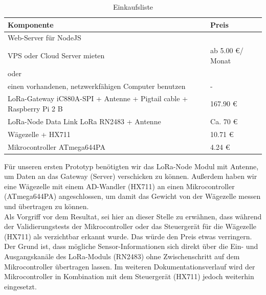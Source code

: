\begin{table}[h]
    \caption{Einkaufsliste}
    \centering

    \begin{tabular}{ | l |  l | }
    \hline
    Komponente & Preis \\ \hline
    Web-Server für NodeJS  & \\
    VPS oder Cloud Server mieten & ab 5.00 \euro / Monat \\
    oder & \\
    einen vorhandenen, netzwerkfähigen Computer benutzen & - \\ \hline
    LoRa-Gateway iC880A-SPI + Antenne + Pigtail cable + Raspberry Pi 2 B & 167.90 \euro \\ \hline
    LoRa-Node Data Link LoRa RN2483 + Antenne & Ca. 70 \euro \\ \hline
    Wägezelle + HX711 & 10.71 \euro \\ \hline
    Mikrocontroller ATmega644PA & 4.24 \euro \\ \hline
    \end{tabular}
\end{table}
\noindent
Für unseren ersten Prototyp benötigten wir das LoRa-Node Modul mit Antenne, um Daten an das Gateway (Server) verschicken zu können. Außerdem haben wir eine Wägezelle mit einem AD-Wandler (HX711) an einen Mikrocontroller (ATmega644PA) angeschlossen, um damit das Gewicht von der Wägezelle messen und übertragen zu können.\\
Als Vorgriff vor dem Resultat, sei hier an dieser Stelle zu erwähnen, dass während der Validierungstests der Mikrocontroller oder das Steuergerät für die Wägezelle (HX711) als verzichtbar erkannt wurde. Das würde den Preis etwas verringern. Der Grund ist, dass mögliche Sensor-Informationen sich direkt über die Ein- und Ausgangskanäle des LoRa-Moduls (RN2483) ohne Zwischenschritt auf dem Mikrocontroller übertragen lassen. Im weiteren Dokumentationsverlauf wird der Mikrocontroller in Kombination mit dem Steuergerät (HX711) jedoch weiterhin eingesetzt. \\

